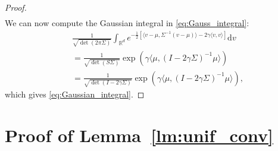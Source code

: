\documentclass[final,12pt]{colt2018}
\numberwithin{equation}{section}
\numberwithin{equation}{section}
\def\Reals{\mathbb{R}}
\def\d{{\mathrm d}}
\def\ave#1{\langle #1 \rangle}
\begin{document}
\begin{proof}
\begin{align*}
    \end{align*}
    We can now compute the Gaussian integral in \eqref{eq:Gauss_integral}:
    \begin{align*}
    	&\frac{1}{\sqrt{\det(2\pi \Sigma)}} \int_{\Reals^d}e^{-\frac{1}{2}[\ave{v-\mu,\Sigma^{-1}(v-\mu)}-2{\gamma}\ave{v,v}]}\d v \\
    	&= \frac{1}{\sqrt{\det (S\Sigma)}} \exp\left({\gamma}\ave{\mu,(I-2{\gamma}\Sigma)^{-1}\mu}\right) \\
    	&=\frac{1}{\sqrt{\det (I-2{\gamma}\Sigma)}} \exp\left({\gamma}\ave{\mu,(I-2{\gamma}\Sigma)^{-1}\mu}\right),
    \end{align*}
	which gives \eqref{eq:Gaussian_integral}.
    \end{proof}

   
   
   \section{Proof of Lemma~\ref{lm:unif_conv}}
   \label{app:unif_conv}
	
\end{document}
